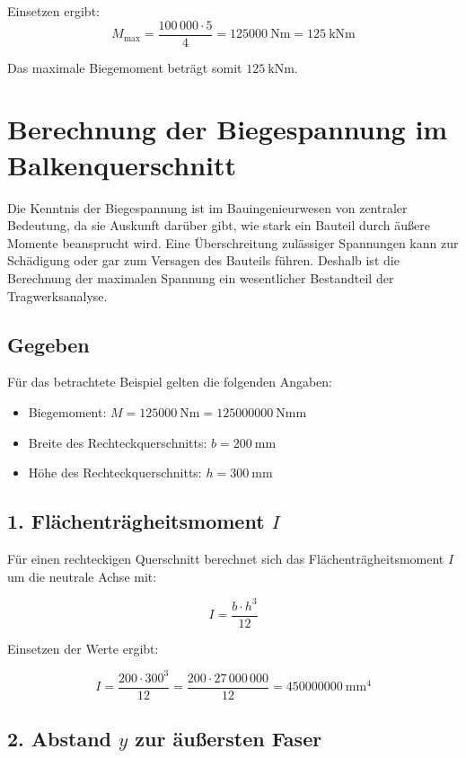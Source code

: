 Einsetzen ergibt:
\[
M_\text{max} = \frac{100\,000 \cdot 5}{4} = \SI{125000}{\newton\meter} = \SI{125}{\kilo\newton\meter}
\]

Das maximale Biegemoment beträgt somit \(\boxed{\SI{125}{\kilo\newton\meter}}\).

\section*{Berechnung der Biegespannung im Balkenquerschnitt}

Die Kenntnis der Biegespannung ist im Bauingenieurwesen von zentraler Bedeutung, da sie Auskunft darüber gibt, wie stark ein Bauteil durch äußere Momente beansprucht wird. Eine Überschreitung zulässiger Spannungen kann zur Schädigung oder gar zum Versagen des Bauteils führen. Deshalb ist die Berechnung der maximalen Spannung ein wesentlicher Bestandteil der Tragwerksanalyse.

\subsection*{Gegeben}

Für das betrachtete Beispiel gelten die folgenden Angaben:

\begin{itemize}
  \item Biegemoment: $M = \SI{125000}{\newton\meter} = \SI{125000000}{\newton\milli\meter}$
  \item Breite des Rechteckquerschnitts: $b = \SI{200}{\milli\meter}$
  \item Höhe des Rechteckquerschnitts: $h = \SI{300}{\milli\meter}$
\end{itemize}

\subsection*{1. Flächenträgheitsmoment $I$}

Für einen rechteckigen Querschnitt berechnet sich das Flächenträgheitsmoment $I$ um die neutrale Achse mit:

\[
I = \frac{b \cdot h^3}{12}
\]

Einsetzen der Werte ergibt:

\[
I = \frac{200 \cdot 300^3}{12} = \frac{200 \cdot 27\,000\,000}{12} = \SI{450000000}{\milli\meter^4}
\]

\subsection*{2. Abstand $y$ zur äußersten Faser}

